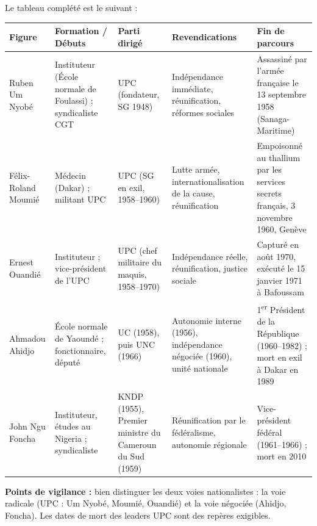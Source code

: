 \documentclass[11pt]{article}
\begin{document}
\begin{corrige}
Le tableau complété est le suivant :
\begin{center}
\begin{tabularx}{\linewidth}{|l|X|X|X|X|}
\hline
\rowcolor{popblueL}
\textbf{Figure} & \textbf{Formation / Débuts} & \textbf{Parti dirigé} & \textbf{Revendications} & \textbf{Fin de parcours} \\ \hline
Ruben Um Nyobé & Instituteur (École normale de Foulassi) ; syndicaliste CGT & UPC (fondateur, SG 1948) & Indépendance immédiate, réunification, réformes sociales & Assassiné par l'armée française le 13 septembre 1958 (Sanaga-Maritime) \\ \hline
Félix-Roland Moumié & Médecin (Dakar) ; militant UPC & UPC (SG en exil, 1958--1960) & Lutte armée, internationalisation de la cause, réunification & Empoisonné au thallium par les services secrets français, 3 novembre 1960, Genève \\ \hline
Ernest Ouandié & Instituteur ; vice-président de l'UPC & UPC (chef militaire du maquis, 1958--1970) & Indépendance réelle, réunification, justice sociale & Capturé en août 1970, exécuté le 15 janvier 1971 à Bafoussam \\ \hline
Ahmadou Ahidjo & École normale de Yaoundé ; fonctionnaire, député & UC (1958), puis UNC (1966) & Autonomie interne (1956), indépendance négociée (1960), unité nationale & 1\textsuperscript{er} Président de la République (1960--1982) ; mort en exil à Dakar en 1989 \\ \hline
John Ngu Foncha & Instituteur, études au Nigeria ; syndicaliste & KNDP (1955), Premier ministre du Cameroun du Sud (1959) & Réunification par le fédéralisme, autonomie régionale & Vice-président fédéral (1961--1966) ; mort en 2010 \\ \hline
\end{tabularx}
\end{center}
\textbf{Points de vigilance :} bien distinguer les deux voies nationalistes : la voie radicale (UPC : Um Nyobé, Moumié, Ouandié) et la voie négociée (Ahidjo, Foncha). Les dates de mort des leaders UPC sont des repères exigibles.
\end{corrige}
\end{document}
